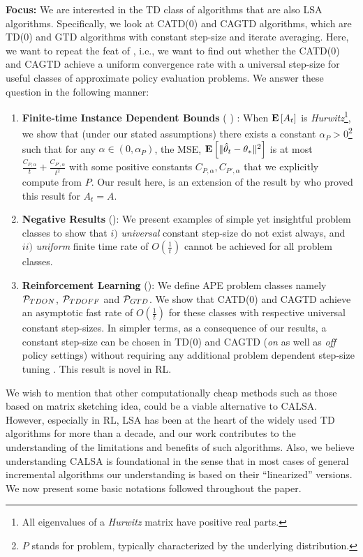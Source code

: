 \textbf{Focus:} We are interested in the TD class of algorithms that are also LSA algorithms. Specifically, we look at CATD(0) and CAGTD algorithms, which are TD(0) and GTD algorithms with constant step-size and iterate averaging. Here, we want to repeat the feat of \cite{bach}, i.e., we want to find out whether the CATD(0) and CAGTD achieve a uniform convergence rate with a universal step-size for useful classes of approximate policy evaluation problems. We answer these question in the following manner:
\begin{enumerate}[leftmargin=*]
\item \textbf{Finite-time Instance Dependent Bounds} ( ) : When $\EE{A_t}$ is \emph{Hurwitz}\footnote{All eigenvalues of a  \emph{Hurwitz} matrix have positive real parts.}, we show that (under our stated assumptions) there exists a constant $\alpha_P>0$\footnote{$P$ stands for problem, typically characterized by the underlying distribution.} such that for any $\alpha\in (0,\alpha_P)$,
the MSE, $\EE{\normsm{\thh_t-\ts}^2}$
is at most $\frac{C_{P,\alpha}}{t}+\frac{C_{P',\alpha}}{t^2}$ with some positive constants $C_{P,\alpha},C_{P',\alpha}$ that we explicitly compute from $P$.
Our result here, is an extension of the result by \citet{polyak-judisky} who proved this result for $A_t=A$.
\item \textbf{Negative Results} (): We present examples of simple yet insightful problem classes to show that $i)$ \emph{universal} constant step-size do not exist always, and $ii)$ \emph{uniform} finite time rate of $O(\frac{1}{t})$ cannot be achieved for all problem classes.
\item \textbf{Reinforcement Learning} (): We define APE problem classes namely $\P_{TDON}$, $\P_{TDOFF}$ and $\P_{GTD}$. We show that CATD(0) and CAGTD achieve an asymptotic fast rate of $O(\frac{1}{t})$ for these classes with respective universal constant step-sizes. In simpler terms, as a consequence of our results, a constant step-size can be chosen in TD(0) and CAGTD (\emph{on} as well as \emph{off} policy settings) without requiring any additional problem dependent step-size tuning . This result is novel in RL.
\end{enumerate}%
We wish to mention that other computationally cheap methods such as those based on matrix sketching idea, could be a viable alternative to  CALSA. However, especially in RL, LSA has been at the heart of the widely used TD algorithms for more than a decade, and our work contributes to the understanding of the limitations and benefits of such algorithms. Also, we believe understanding CALSA is foundational in the sense that in most cases of general incremental algorithms our understanding is based on their ``linearized'' versions. We now present some basic notations followed throughout the paper.

